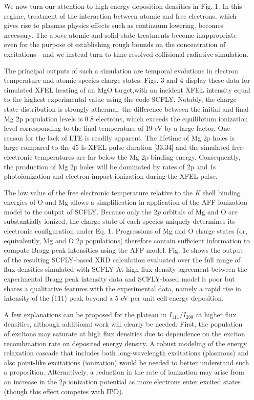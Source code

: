 We now turn our attention to high energy deposition densities in Fig. 1.
In this regime, treatment of the interaction between atomic and free
electrons, which gives rise to plasmas physics effects such as continuum
lowering, becomes necessary. The above atomic and solid state treatments
become inappropriate---even for the purpose of establishing rough bounds
on the concentration of excitations---and we instead turn to
time-resolved collisional radiative simulation.

The principal outputs of such a simulation are temporal evolutions in
electron temperature and atomic species charge states. Figs. 3 and 4
display these data for simulated XFEL heating of an MgO target,with an
incident XFEL intensity equal to the highest experimental value using
the code SCFLY. Notably, the charge state distribution is strongly
athermal: the difference between the initial and final Mg 2p population
levels is 0.8 electrons, which exceeds the equilibrium ionization level
corresponding to the final temperature of 19 eV by a large factor. One
reason for the lack of LTE is readily apparent. The lifetime of Mg 2p
holes is large compared to the 45 fs XFEL pulse duration {[}33,34{]} and
the simulated free-electronic temperatures are far below the Mg 2p
binding energy. Consequently, the production of Mg 2p holes will be
dominated by rates of 2p and 1s photoionization and electron impact
ionization during the XFEL pulse.

The low value of the free electronic temperature relative to the
\emph{K} shell binding energies of O and Mg allows a simplification in
application of the AFF ionization model to the output of SCFLY. Because
only the 2\emph{p} orbitals of Mg and O are substantially ionized, the
charge state of each species uniquely determines its electronic
configuration under Eq. 1. Progressions of Mg and O charge states (or,
equivalently, Mg and O 2\emph{p} populations) therefore contain
sufficient information to compute Bragg peak intensities using the AFF
model. Fig. 1c shows the output of the resulting SCFLY-based XRD
calculation evaluated over the full range of flux densities simulated
with SCFLY At high flux density agreement between the experimental Bragg
peak intensity data and SCFLY-based model is poor but shares a
qualitative features with the experimental data, namely a rapid rise in
intensity of the (111) peak beyond a 5 eV per unit cell energy
deposition.

A few explanations can be proposed for the plateau in
\(I_{111}/I_{200}\) at higher flux densities, although additional work
will clearly be needed. First, the population of excitons may saturate
at high flux densities due to dependence on the exciton recombination
rate on deposited energy density. A robust modeling of the energy
relaxation cascade that includes both long-wavelength excitations
(plasmons) and also point-like excitations (ionization) would be needed
to better understand such a proposition. Alternatively, a reduction in
the rate of ionization may arise from an increase in the 2\emph{p}
ionization potential as more electrons enter excited states (though this
effect competes with IPD).

